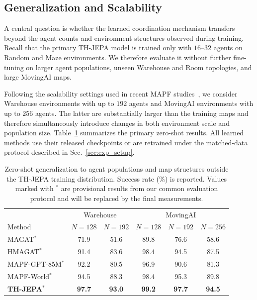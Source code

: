 \documentclass{article} %
\begin{document}
\subsection{Generalization and Scalability}
\label{sec:generalization}

A central question is whether the learned coordination mechanism transfers beyond the agent counts and environment structures observed during training. Recall that the primary TH-JEPA model is trained only with $16$--$32$ agents on Random and Maze environments. We therefore evaluate it without further fine-tuning on larger agent populations, unseen Warehouse and Room topologies, and large MovingAI maps.

Following the scalability settings used in recent MAPF studies~\cite{yang2025mapfworld,jain2026hmagat}, we consider Warehouse environments with up to $192$ agents and MovingAI environments with up to $256$ agents. The latter are substantially larger than the training maps and therefore simultaneously introduce changes in both environment scale and population size. Table~\ref{tab:ood_scaling} summarizes the primary zero-shot results. All learned methods use their released checkpoints or are retrained under the matched-data protocol described in Sec.~\ref{sec:exp_setup}.

\begin{table}[t]
\centering
\caption{Zero-shot generalization to agent populations and map structures outside the TH-JEPA training distribution. Success rate (\%) is reported. Values marked with $^\ast$ are provisional results from our common evaluation protocol and will be replaced by the final measurements.}
\label{tab:ood_scaling}
\small
\setlength{\tabcolsep}{3.5pt}
\begin{tabular}{lccccc}
\toprule
& \multicolumn{2}{c}{Warehouse} &
\multicolumn{3}{c}{MovingAI} \\
Method
& $N=128$ & $N=192$
& $N=128$ & $N=192$ & $N=256$ \\
\midrule
MAGAT$^\ast$
& 71.9 & 51.6 & 89.8 & 76.6 & 58.6 \\
HMAGAT$^\ast$
& 91.4 & 83.6 & 98.4 & 94.5 & 87.5 \\
MAPF-GPT-85M$^\ast$
& 92.2 & 80.5 & 96.9 & 90.6 & 81.3 \\
MAPF-World$^\ast$
& 94.5 & 88.3 & 98.4 & 95.3 & 89.8 \\
\midrule
\textbf{TH-JEPA}$^\ast$
& \textbf{97.7} & \textbf{93.0}
& \textbf{99.2} & \textbf{97.7} & \textbf{94.5} \\
\bottomrule
\end{tabular}
\end{table}
\end{document}
